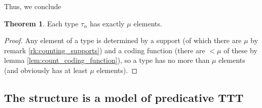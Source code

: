 \documentclass{article}
\theoremstyle{definition}
\newtheorem{theorem}{Theorem}[section]
\theoremstyle{remark}
\begin{document}
{Thus, we conclude}
\begin{theorem}\label{thm:count_elements}
{Each type $\tau_\alpha$ has exactly $\mu$ elements.}
\end{theorem}
\begin{proof}
Any element of a type is determined by a support (of which there are $\mu$ {by remark \ref{rk:counting_supports}}) and a coding function (there are $<\mu$ of these {by lemma \ref{lem:count_coding_function}}), so a type has no more than $\mu$ elements (and obviously has at least $\mu$ elements).
\end{proof}

\newpage
\subsection{The structure is a model of predicative TTT}\label{ss:predicative_ttt}
\end{document}
